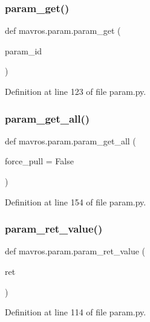 \subsubsection{\texorpdfstring{param\_get()}{param\_get()}}
{\footnotesize\ttfamily def mavros.\+param.\+param\+\_\+get (\begin{DoxyParamCaption}\item[{}]{param\+\_\+id }\end{DoxyParamCaption})}



Definition at line 123 of file param.\+py.

\mbox{\label{namespacemavros_1_1param_a77546eca26e806461988d639c318bae2}} 
\subsubsection{\texorpdfstring{param\_get\_all()}{param\_get\_all()}}
{\footnotesize\ttfamily def mavros.\+param.\+param\+\_\+get\+\_\+all (\begin{DoxyParamCaption}\item[{}]{force\+\_\+pull = {\ttfamily False} }\end{DoxyParamCaption})}



Definition at line 154 of file param.\+py.

\mbox{\label{namespacemavros_1_1param_a47a4fed2cd6c71f24fff0571bbb126f2}} 
\subsubsection{\texorpdfstring{param\_ret\_value()}{param\_ret\_value()}}
{\footnotesize\ttfamily def mavros.\+param.\+param\+\_\+ret\+\_\+value (\begin{DoxyParamCaption}\item[{}]{ret }\end{DoxyParamCaption})}



Definition at line 114 of file param.\+py.

\mbox{\label{namespacemavros_1_1param_a3f39b84fd5b9c353aac72b8a3fa17eff}} 
